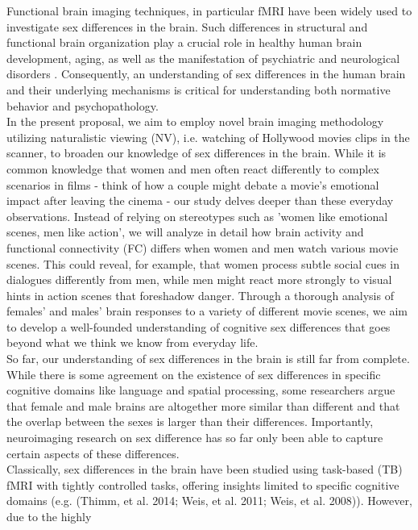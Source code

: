\documentclass[11pt,a4paper]{article}
\begin{document}
Functional brain imaging techniques, in particular fMRI have been widely used to investigate sex differences in the brain.
Such differences in structural and functional brain organization play a crucial role in healthy human brain development, 
aging, as well as the manifestation of psychiatric and neurological disorders \parencite{cahillWhySexMatters2006, gobinathSexHormonesGenotype2017}. 
Consequently, an understanding of sex differences in the human brain and 
their underlying mechanisms is critical for understanding both normative behavior and psychopathology. \\
In the present proposal, we aim to employ novel brain imaging methodology utilizing naturalistic viewing (NV), 
i.e. watching of Hollywood movies clips in the scanner, to broaden our knowledge of sex differences in the brain. 
While it is common knowledge that women and men often react differently to complex scenarios in 
films - think of how a couple might debate a movie's emotional impact after leaving the cinema - our study 
delves deeper than these everyday observations. Instead of relying on stereotypes such as 
'women like emotional scenes, men like action', we will analyze in detail how brain activity and functional 
connectivity (FC) differs when women and men watch various movie scenes. This could reveal, for example, 
that women process subtle social cues in dialogues differently from men, while men might react more strongly to 
visual hints in action scenes that foreshadow danger. Through a thorough analysis of females' and males' brain 
responses to a variety of different movie scenes, we aim to develop a well-founded understanding of cognitive 
sex differences that goes beyond what we think we know from everyday life.\\
So far, our understanding of sex differences in the brain is still far from complete. 
While there is some agreement on the existence of sex differences in specific cognitive domains like 
language and spatial processing, some researchers argue that female and male brains are altogether more similar 
than different \parencite{joelSexGenitaliaHuman2015} and that the overlap between the sexes is larger than their differences. 
Importantly, neuroimaging research on sex difference has so far only been able to capture certain aspects of these 
differences.\\ 
Classically, sex differences in the brain have been studied using task-based (TB) fMRI with tightly 
controlled tasks, offering insights limited to specific cognitive domains 
(e.g. (Thimm, et al. 2014; Weis, et al. 2011; Weis, et al. 2008)). However, due to the highly 
\end{document}
